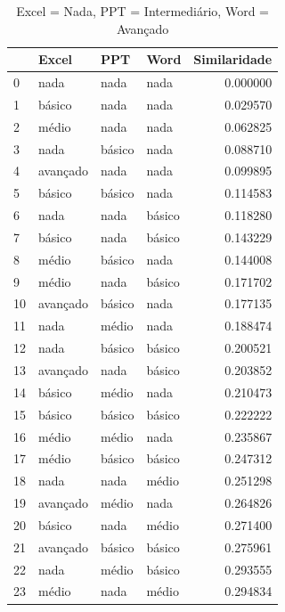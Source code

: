 \documentclass[]{article}
\begin{document}
	\begin{longtable}{|llll|r|}
		\caption{Excel = Nada, PPT = Intermediário, Word = Avançado}
		\label{variability_impl_mech}
		\endfirsthead
		\endhead
		
		\hline
		{} & Excel     & PPT       & Word      & Similaridade \\
		\hline
		0  & nada      & nada      & nada      & 0.000000     \\
		1  & básico   & nada      & nada      & 0.029570     \\
		2  & médio    & nada      & nada      & 0.062825     \\
		3  & nada      & básico   & nada      & 0.088710     \\
		4  & avançado & nada      & nada      & 0.099895     \\
		5  & básico   & básico   & nada      & 0.114583     \\
		6  & nada      & nada      & básico   & 0.118280     \\
		7  & básico   & nada      & básico   & 0.143229     \\
		8  & médio    & básico   & nada      & 0.144008     \\
		9  & médio    & nada      & básico   & 0.171702     \\
		10 & avançado & básico   & nada      & 0.177135     \\
		11 & nada      & médio    & nada      & 0.188474     \\
		12 & nada      & básico   & básico   & 0.200521     \\
		13 & avançado & nada      & básico   & 0.203852     \\
		14 & básico   & médio    & nada      & 0.210473     \\
		15 & básico   & básico   & básico   & 0.222222     \\
		16 & médio    & médio    & nada      & 0.235867     \\
		17 & médio    & básico   & básico   & 0.247312     \\
		18 & nada      & nada      & médio    & 0.251298     \\
		19 & avançado & médio    & nada      & 0.264826     \\
		20 & básico   & nada      & médio    & 0.271400     \\
		21 & avançado & básico   & básico   & 0.275961     \\
		22 & nada      & médio    & básico   & 0.293555     \\
		23 & médio    & nada      & médio    & 0.294834     \\

\end{longtable}
\end{document}
